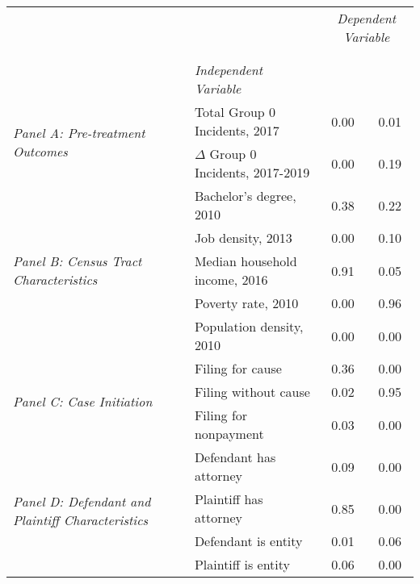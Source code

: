 \begin{tabular}{llcc}
\toprule
 &  & \multicolumn{2}{c}{\textit{Dependent Variable}} \\
\cline{3-4}
\\
 &  &  &  \\
 & \emph{Independent Variable} &  &  \\
\midrule
\multirow[c]{2}{3cm}{\textit{Panel A: Pre-treatment Outcomes}} & Total Group 0 Incidents, 2017 & 0.00 & 0.01 \\
 & $\Delta$ Group 0 Incidents, 2017-2019 & 0.00 & 0.19 \\
\cline{1-4}
\multirow[c]{5}{3cm}{\textit{Panel B: Census Tract Characteristics}} & Bachelor's degree, 2010 & 0.38 & 0.22 \\
 & Job density, 2013 & 0.00 & 0.10 \\
 & Median household income, 2016 & 0.91 & 0.05 \\
 & Poverty rate, 2010 & 0.00 & 0.96 \\
 & Population density, 2010 & 0.00 & 0.00 \\
\cline{1-4}
\multirow[c]{3}{3cm}{\textit{Panel C: Case Initiation}} & Filing for cause & 0.36 & 0.00 \\
 & Filing without cause & 0.02 & 0.95 \\
 & Filing for nonpayment & 0.03 & 0.00 \\
\cline{1-4}
\multirow[c]{4}{3cm}{\textit{Panel D: Defendant and Plaintiff Characteristics}} & Defendant has attorney & 0.09 & 0.00 \\
 & Plaintiff has attorney & 0.85 & 0.00 \\
 & Defendant is entity & 0.01 & 0.06 \\
 & Plaintiff is entity & 0.06 & 0.00 \\
\cline{1-4}
\bottomrule
\end{tabular}
